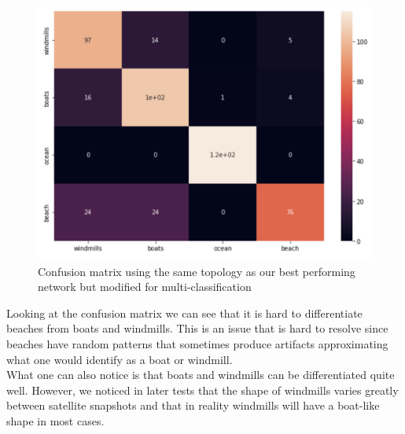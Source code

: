 \begin{figure}[ht]
\begin{center}
\centerline{\includegraphics[width=\columnwidth]{images/mul-confusion.png}}
\caption{Confusion matrix using the same topology as our best performing network but modified for multi-classification}
\label{mul-confusion}
\end{center}
\end{figure}

Looking at the confusion matrix we can see that it is hard to differentiate beaches from boats and windmills. This is an issue that is hard to resolve since beaches have random patterns that sometimes produce artifacts approximating what one would identify as a boat or windmill.\\

What one can also notice is that boats and windmills can be differentiated quite well. However, we noticed in later tests that the shape of windmills varies greatly between satellite snapshots and that in reality windmills will have a boat-like shape in most cases.

